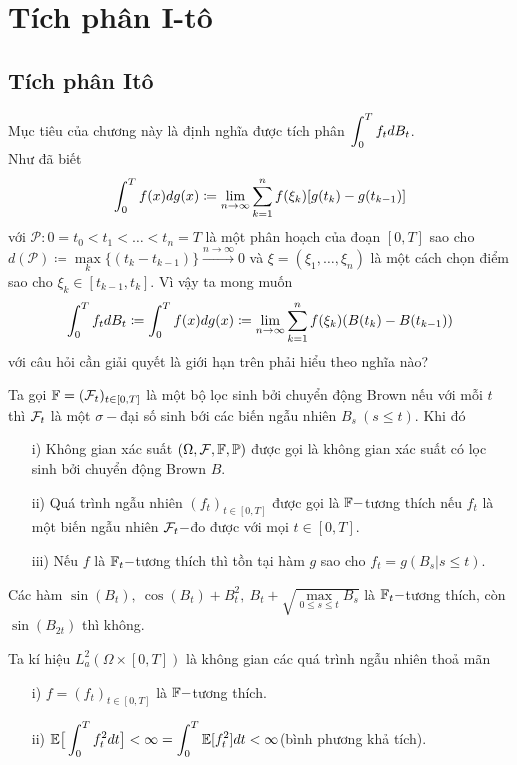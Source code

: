 \chapter{Tích phân I-tô}
\section{Tích phân Itô}
Mục tiêu của chương này là định nghĩa được tích phân $\displaystyle \displaystyle \int _{0}^{T}f_tdB_t$. \\
Như đã biết  
\[
    \displaystyle \displaystyle \int _{0}^{T}f(x)dg(x)\coloneqq \lim\limits_{n\to \infty}\sum_{k=1}^nf(\xi_k)[g(t_k)-g(t_{k-1})]
\] 
với  $\mathcal{P}: 0=t_0<t_1<\ldots<t_n=T$ là một phân hoạch của đoạn $[0,T]$ sao cho $d(\mathcal{P})\coloneqq \max\limits_{k}\{(t_k-t_{k-1})\}\xrightarrow[]{n\to \infty} 0$ và $\xi = (\xi_1,\ldots,\xi_n)$ là một cách chọn điểm sao cho $\xi_k \in [t_{k-1},t_k]$.
Vì vậy ta mong muốn  
\[
    \displaystyle \displaystyle \int _{0}^{T}f_tdB_t \coloneqq \displaystyle \displaystyle \int _{0}^{T}f(x)dg(x)\coloneqq \lim\limits_{n\to \infty}\sum_{k=1}^nf(\xi_k)(B(t_k)-B(t_{k-1}))
\] 
với câu hỏi cần giải quyết là giới hạn trên phải hiểu theo nghĩa nào?
\begin{defn}
    Ta gọi $\mathbb{F} = (\mathcal{F}_t)_{t\in [0, T]}$ là một bộ lọc sinh bởi chuyển động Brown nếu với mỗi $t$ thì $\mathcal{F}_t$ là một $\sigma-$đại số sinh bới các biến ngẫu nhiên $B_s~(s \leq t)$. Khi đó
    \begin{itemize}
        \item[i)]Không gian xác suất $(\Omega, \mathcal{F}, \mathbb{F}, \mathbb{P})$ được gọi là không gian xác suất có lọc sinh bởi chuyển động Brown $B$.
        \item[ii)]Quá trình ngẫu nhiên $(f_t)_{t\in [0, T]}$ được gọi là $\mathbb{F}-$tương thích nếu $f_t$ là một biến ngẫu nhiên $\mathcal{F}_t-$đo được với mọi $t\in [0,T]$.
        \item[iii)] Nếu $f$ là $\mathbb{F}_t-$tương thích thì tồn tại hàm $g$ sao cho $f_t=g(B_s|s\leq t)$.
    \end{itemize}
\end{defn}
\begin{exam*}
    Các hàm $\sin (B_t),~\cos(B_t) + B_t^2,~B_t+\sqrt{\max\limits_{0\leq s\leq t}{B_s}}$ là $\mathbb{F}_t-$tương thích, còn $\sin (B_{2t})$ thì không.
\end{exam*}
\begin{defn}
    Ta kí hiệu $L_a^2(\Omega \times [0,T])$ là không gian các quá trình ngẫu nhiên thoả mãn
    \begin{itemize}
        \item[i)] $f=(f_t)_{t\in [0, T]}$ là $\mathbb{F}-$tương thích.
        \item[ii)] $\mathbb{E}\big[\displaystyle \int_{0}^{T}f_t^2dt\big]<\infty=\displaystyle \int_{0}^{T}\mathbb{E}[f_t^2]dt<\infty$(bình phương khả tích).
    \end{itemize}
\end{defn}
